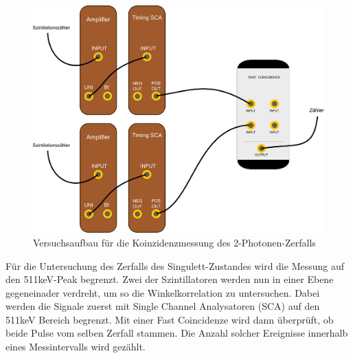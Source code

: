 \begin{figure}
 \includegraphics[width=\textwidth]{BilderAufbau/2er-koinzidenz.pdf}
 \caption{Versuchsaufbau für die Koinzidenzmessung des 2-Photonen-Zerfalls}
 \label{schaltplan_2_sca_coin_zaehler}
\end{figure}

Für die Untersuchung des Zerfalls des Singulett-Zustandes wird die Messung auf den 511keV-Peak begrenzt. Zwei der Szintillatoren werden nun in einer Ebene gegeneinader verdreht, um so die Winkelkorrelation zu untersuchen. Dabei werden die Signale zuerst mit Single Channel Analysatoren (SCA) auf den 511keV Bereich begrenzt. Mit einer Fast Coincidenze wird dann überprüft, ob beide Pulse vom selben Zerfall stammen. Die Anzahl solcher Ereignisse innerhalb eines Messintervalls wird gezählt. 


